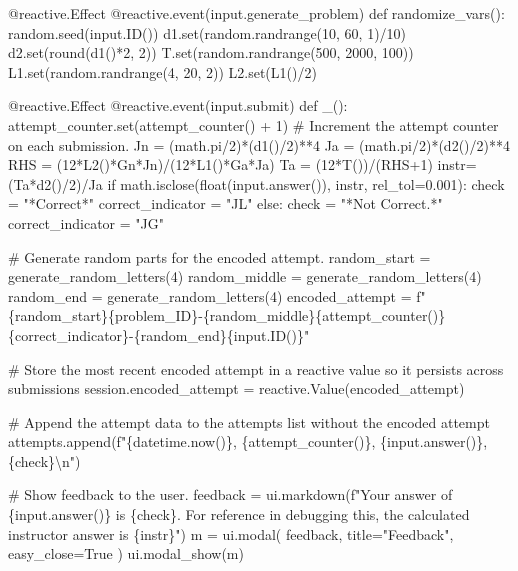 \documentclass[
  letterpaper,
  DIV=11,
  numbers=noendperiod]{scrreprt}
\newenvironment{Shaded}{\begin{snugshade}}{\end{snugshade}}
\newcommand{\NormalTok}[1]{\textcolor[rgb]{0.00,0.23,0.31}{#1}}
\begin{document}
\begin{Shaded}
\begin{Highlighting}[]
\NormalTok{    @reactive.Effect}
\NormalTok{    @reactive.event(input.generate\_problem)}
\NormalTok{    def randomize\_vars():}
\NormalTok{        random.seed(input.ID())}
\NormalTok{        d1.set(random.randrange(10, 60, 1)/10)}
\NormalTok{        d2.set(round(d1()*2, 2))}
\NormalTok{        T.set(random.randrange(500, 2000, 100))}
\NormalTok{        L1.set(random.randrange(4, 20, 2))}
\NormalTok{        L2.set(L1()/2)}
        
        
\NormalTok{    @reactive.Effect}
\NormalTok{    @reactive.event(input.submit)}
\NormalTok{    def \_():}
\NormalTok{        attempt\_counter.set(attempt\_counter() + 1)  \# Increment the attempt counter on each submission.}
\NormalTok{        Jn = (math.pi/2)*(d1()/2)**4}
\NormalTok{        Ja = (math.pi/2)*(d2()/2)**4}
\NormalTok{        RHS = (12*L2()*Gn*Jn)/(12*L1()*Ga*Ja)}
\NormalTok{        Ta = (12*T())/(RHS+1)}
\NormalTok{        instr= (Ta*d2()/2)/Ja}
\NormalTok{        if math.isclose(float(input.answer()), instr, rel\_tol=0.001):}
\NormalTok{            check = "*Correct*"}
\NormalTok{            correct\_indicator = "JL"}
\NormalTok{        else:}
\NormalTok{            check = "*Not Correct.*"}
\NormalTok{            correct\_indicator = "JG"}

\NormalTok{        \# Generate random parts for the encoded attempt.}
\NormalTok{        random\_start = generate\_random\_letters(4)}
\NormalTok{        random\_middle = generate\_random\_letters(4)}
\NormalTok{        random\_end = generate\_random\_letters(4)}
\NormalTok{        encoded\_attempt = f"\{random\_start\}\{problem\_ID\}{-}\{random\_middle\}\{attempt\_counter()\}\{correct\_indicator\}{-}\{random\_end\}\{input.ID()\}"}

\NormalTok{        \# Store the most recent encoded attempt in a reactive value so it persists across submissions}
\NormalTok{        session.encoded\_attempt = reactive.Value(encoded\_attempt)}

\NormalTok{        \# Append the attempt data to the attempts list without the encoded attempt}
\NormalTok{        attempts.append(f"\{datetime.now()\}, \{attempt\_counter()\}, \{input.answer()\}, \{check\}\textbackslash{}n")}

\NormalTok{        \# Show feedback to the user.}
\NormalTok{        feedback = ui.markdown(f"Your answer of \{input.answer()\} is \{check\}. For reference in debugging this, the calculated instructor answer is \{instr\}")}
\NormalTok{        m = ui.modal(}
\NormalTok{            feedback,}
\NormalTok{            title="Feedback",}
\NormalTok{            easy\_close=True}
\NormalTok{        )}
\NormalTok{        ui.modal\_show(m)}


\end{Highlighting}
\end{Shaded}
\end{document}
